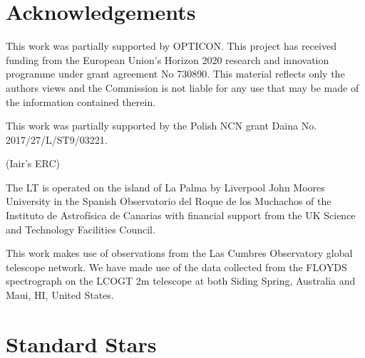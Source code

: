 \documentclass[fleqn,usenatbib]{mnras}
\begin{document}
\section*{Acknowledgements}
This work was partially supported by OPTICON. This project has
received funding from the European Union’s Horizon 2020 research and
innovation programme under grant agreement No 730890. This material
reflects only the authors views and the Commission is not liable for
any use that may be made of the information contained therein.

This work was partially supported by the Polish NCN grant Daina
No. 2017/27/L/ST9/03221.

(Iair's ERC)

The LT is operated on the island of La Palma by Liverpool
John Moores University in the Spanish Observatorio del Roque
de los Muchachos of the Instituto de Astrof{\'i}sica de Canarias with
financial support from the UK Science and Technology Facilities
Council.

This work makes use of observations from the Las Cumbres Observatory
global telescope network. We have made use of the data collected from
the FLOYDS spectrograph on the LCOGT 2m telescope at both Siding Spring,
Australia and Maui, HI, United States.







\appendix

\section{Standard Stars}



\bsp	%
\label{lastpage}
\end{document}
